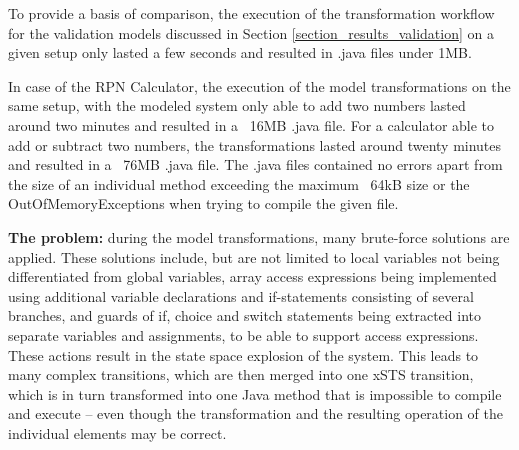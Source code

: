 To provide a basis of comparison, the execution of the transformation workflow for the validation models discussed in Section \ref{section_results_validation} on a given setup only lasted a few seconds and resulted in .java files under 1MB.

In case of the RPN Calculator, the execution of the model transformations on the same setup, with the modeled system only able to add two numbers lasted around two minutes and resulted in a ~16MB .java file. For a calculator able to add or subtract two numbers, the transformations lasted around twenty minutes and resulted in a ~76MB .java file. The .java files contained no errors apart from the size of an individual method exceeding the maximum ~64kB size or the OutOfMemoryExceptions when trying to compile the given file.

\textbf{The problem:} during the model transformations, many brute-force solutions are applied. These solutions include, but are not limited to local variables not being differentiated from global variables, array access expressions being implemented using additional variable declarations and if-statements consisting of several branches, and guards of if, choice and switch statements being extracted into separate variables and assignments, to be able to support access expressions. These actions result in the state space explosion of the system. This leads to many complex transitions, which are then merged into one xSTS transition, which is in turn transformed into one Java method that is impossible to compile and execute -- even though the transformation and the resulting operation of the individual elements may be correct.

